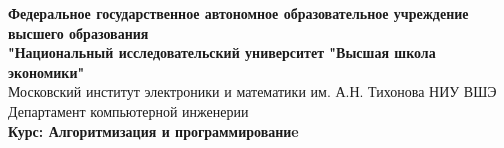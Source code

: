 \begin{titlepage}
    \begin{center}
        \textbf{Федеральное государственное автономное образовательное учреждение\\ высшего образования\\ 
        "Национальный исследовательский университет "Высшая школа экономики"}\\
        \vspace{1cm}
        Московский институт электроники и математики им. А.Н. Тихонова НИУ ВШЭ\\
        Департамент компьютерной инженерии\\
        \vspace{0.5cm}
        \textbf{Курс: Алгоритмизация и программированиe}\\
    \end{center}
    \vspace{1.5cm}


\end{titlepage}
